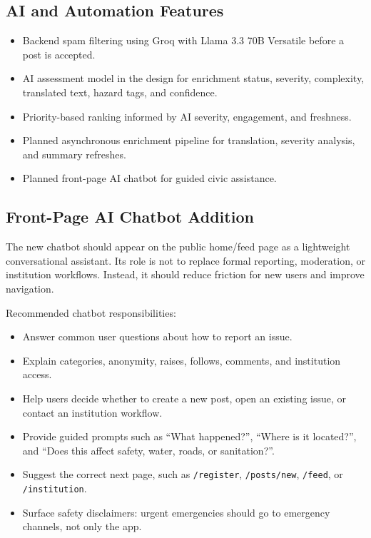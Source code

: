 \documentclass[11pt,a4paper]{article}
\begin{document}
\subsection{AI and Automation Features}
\begin{itemize}
  \item Backend spam filtering using Groq with Llama 3.3 70B Versatile before a post is accepted.
  \item AI assessment model in the design for enrichment status, severity, complexity, translated text, hazard tags, and confidence.
  \item Priority-based ranking informed by AI severity, engagement, and freshness.
  \item Planned asynchronous enrichment pipeline for translation, severity analysis, and summary refreshes.
  \item Planned front-page AI chatbot for guided civic assistance.
\end{itemize}

\subsection{Front-Page AI Chatbot Addition}
The new chatbot should appear on the public home/feed page as a lightweight conversational assistant. Its role is not to replace formal reporting, moderation, or institution workflows. Instead, it should reduce friction for new users and improve navigation.

Recommended chatbot responsibilities:
\begin{itemize}
  \item Answer common user questions about how to report an issue.
  \item Explain categories, anonymity, raises, follows, comments, and institution access.
  \item Help users decide whether to create a new post, open an existing issue, or contact an institution workflow.
  \item Provide guided prompts such as ``What happened?'', ``Where is it located?'', and ``Does this affect safety, water, roads, or sanitation?''.
  \item Suggest the correct next page, such as \texttt{/register}, \texttt{/posts/new}, \texttt{/feed}, or \texttt{/institution}.
  \item Surface safety disclaimers: urgent emergencies should go to emergency channels, not only the app.
\end{itemize}
\end{document}
